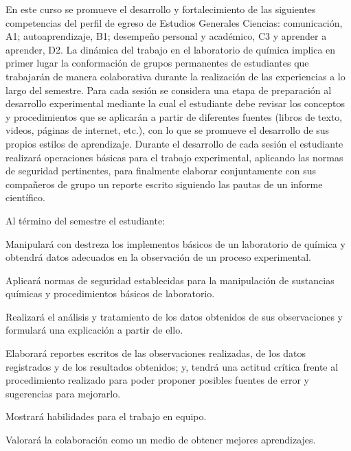 \begin{syllabus}


\begin{justification}
En este curso se promueve el desarrollo y fortalecimiento de las siguientes competencias del perfil de egreso de Estudios Generales Ciencias: comunicación, A1; autoaprendizaje, B1; desempeño personal y académico, C3 y aprender a aprender, D2. La dinámica del trabajo en el laboratorio de química implica en primer lugar la conformación de grupos permanentes de estudiantes que trabajarán de manera colaborativa durante la realización de las experiencias a lo largo del semestre. Para cada sesión se considera una etapa de preparación al desarrollo experimental mediante la cual el estudiante debe revisar los conceptos y procedimientos que se aplicarán a partir de diferentes fuentes (libros de texto, videos, páginas de internet, etc.), con lo que se promueve el desarrollo de sus propios estilos de aprendizaje. Durante el desarrollo de cada sesión el estudiante realizará operaciones básicas para el trabajo experimental, aplicando las normas de seguridad pertinentes, para finalmente elaborar conjuntamente con sus compañeros de grupo un reporte escrito siguiendo las pautas de un informe científico.

Al término del semestre el estudiante:
\end{justification}

\begin{goals}

\item Manipulará con destreza los implementos básicos de un laboratorio de química y obtendrá datos adecuados en la observación de un proceso experimental. 
\item Aplicará normas de seguridad establecidas para la manipulación de sustancias químicas y procedimientos básicos de laboratorio.
\item Realizará el análisis y tratamiento de los datos obtenidos de sus observaciones y formulará una explicación a partir de ello.
\item Elaborará reportes escritos de las observaciones realizadas, de los datos registrados y de los resultados obtenidos; y, tendrá una actitud crítica frente al procedimiento realizado para poder proponer posibles fuentes de error y sugerencias para mejorarlo. 
\item Mostrará habilidades para el trabajo en equipo.
\item Valorará la colaboración como un medio de obtener mejores aprendizajes.
\end{goals}


\end{syllabus}
